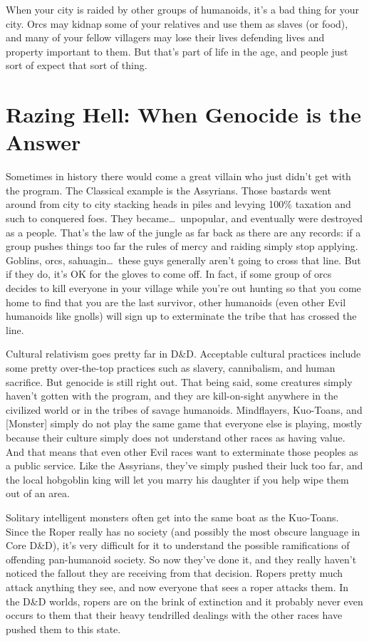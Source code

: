 When your city is raided by other groups of humanoids, it's a bad thing for your city. Orcs may kidnap some of your relatives and use them as slaves (or food), and many of your fellow villagers may lose their lives defending lives and property important to them. But that's part of life in the age, and people just sort of expect that sort of thing.

\section{Razing Hell: When Genocide is the Answer}

Sometimes in history there would come a great villain who just didn't get with the program. The Classical example is the Assyrians. Those bastards went around from city to city stacking heads in piles and levying 100\% taxation and such to conquered foes. They became\ldots\  unpopular, and eventually were destroyed as a people. That's the law of the jungle as far back as there are any records: if a group pushes things too far the rules of mercy and raiding simply stop applying. Goblins, orcs, sahuagin\ldots\  these guys generally aren't going to cross that line. But if they do, it's OK for the gloves to come off. In fact, if some group of orcs decides to kill everyone in your village while you're out hunting so that you come home to find that you are the last survivor, other humanoids (even other Evil humanoids like gnolls) will sign up to exterminate the tribe that has crossed the line.

Cultural relativism goes pretty far in D\&D. Acceptable cultural practices include some pretty over-the-top practices such as slavery, cannibalism, and human sacrifice. But genocide is still right out. That being said, some creatures simply haven't gotten with the program, and they are kill-on-sight anywhere in the civilized world or in the tribes of savage humanoids. Mindflayers, Kuo-Toans, and [Monster] simply do not play the same game that everyone else is playing, mostly because their culture simply does not understand other races as having value. And that means that even other Evil races want to exterminate those peoples as a public service. Like the Assyrians, they've simply pushed their luck too far, and the local hobgoblin king will let you marry his daughter if you help wipe them out of an area.

Solitary intelligent monsters often get into the same boat as the Kuo-Toans. Since the Roper really has no society (and possibly the most obscure language in Core D\&D), it's very difficult for it to understand the possible ramifications of offending pan-humanoid society. So now they've done it, and they really haven't noticed the fallout they are receiving from that decision. Ropers pretty much attack anything they see, and now everyone that sees a roper attacks them. In the D\&D worlds, ropers are on the brink of extinction and it probably never even occurs to them that their heavy tendrilled dealings with the other races have pushed them to this state.

